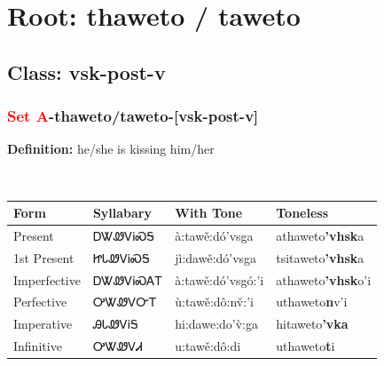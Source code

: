 \needspace{4in}
\section*{Root: thaweto / taweto}
\nopagebreak
{}
\needspace{3in}
\subsection*{Class: vsk-post-v}
\nopagebreak
\needspace{2in}
\subsubsection*{\textcolor{Red}{Set A}{-}\textbf{thaweto/taweto}{-}[vsk-post-v]}
\nopagebreak
\textbf{Definition: } he/she is kissing him/her
\\[0.5em]
\begin{tabularx}{\textwidth}{l X X X}%
\toprule%
\textbf{Form}&\textbf{Syllabary}&\textbf{With Tone}&\textbf{Toneless}\\%
\midrule%
Present&ᎠᏔᏪᏙᎥᏍᎦ&à:tawě:dó’vsga&athaweto\textbf{'vhsk}a\\%
1st Present&ᏥᏓᏪᏙᎥᏍᎦ&jì:dawě:dó’vsga&tsitaweto\textbf{'vhsk}a\\%
Imperfective&ᎠᏔᏪᏙᎥᏍᎪᎢ&à:tawě:dó’vsgó:’i&athaweto\textbf{'vhsk}o'i\\%
Perfective&ᎤᏔᏪᏙᏅᎢ&ù:tawě:dô:nv̌:’i&uthaweto\textbf{n}v'i\\%
Imperative&ᎯᏓᏪᏙᎥᎦ&hi:dawe:do’v̀:ga&hitaweto\textbf{'vka}\\%
Infinitive&ᎤᏔᏪᏙᏗ&u:tawě:dô:di&uthaweto\textbf{t}i\\%
\bottomrule%
\end{tabularx}
\\[1em]